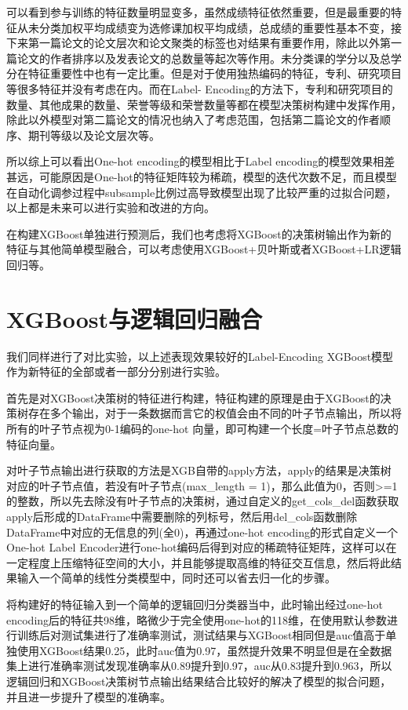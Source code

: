 可以看到参与训练的特征数量明显变多，虽然成绩特征依然重要，但是最重要的特征从未分类加权平均成绩变为选修课加权平均成绩，总成绩的重要性基本不变，接下来第一篇论文的论文层次和论文聚类的标签也对结果有重要作用，除此以外第一篇论文的作者排序以及发表论文的总数量等起次等作用。未分类课的学分以及总学分在特征重要性中也有一定比重。但是对于使用独热编码的特征，专利、研究项目等很多特征并没有考虑在内。而在Label- Encoding的方法下，专利和研究项目的数量、其他成果的数量、荣誉等级和荣誉数量等都在模型决策树构建中发挥作用，除此以外模型对第二篇论文的情况也纳入了考虑范围，包括第二篇论文的作者顺序、期刊等级以及论文层次等。

所以综上可以看出One-hot encoding的模型相比于Label encoding的模型效果相差甚远，可能原因是One-hot的特征矩阵较为稀疏，模型的迭代次数不足，而且模型在自动化调参过程中subsample比例过高导致模型出现了比较严重的过拟合问题，以上都是未来可以进行实验和改进的方向。

在构建XGBoost单独进行预测后，我们也考虑将XGBoost的决策树输出作为新的特征与其他简单模型融合，可以考虑使用XGBoost+贝叶斯或者XGBoost+LR逻辑回归等。

\section{XGBoost与逻辑回归融合}

我们同样进行了对比实验，以上述表现效果较好的Label-Encoding XGBoost模型作为新特征的全部或者一部分分别进行实验。

首先是对XGBoost决策树的特征进行构建，特征构建的原理是由于XGBoost的决策树存在多个输出，对于一条数据而言它的权值会由不同的叶子节点输出，所以将所有的叶子节点视为0-1编码的one-hot 向量，即可构建一个长度=叶子节点总数的特征向量。

对叶子节点输出进行获取的方法是XGB自带的apply方法，apply的结果是决策树对应的叶子节点值，若没有叶子节点(max\_length = 1)，那么此值为0，否则>=1的整数，所以先去除没有叶子节点的决策树，通过自定义的get\_cols\_del函数获取apply后形成的DataFrame中需要删除的列标号，然后用del\_cols函数删除DataFrame中对应的无信息的列(全0)，再通过one-hot encoding的形式自定义一个One-hot Label Encoder进行one-hot编码后得到对应的稀疏特征矩阵，这样可以在一定程度上压缩特征空间的大小，并且能够提取高维的特征交互信息，然后将此结果输入一个简单的线性分类模型中，同时还可以省去归一化的步骤。

将构建好的特征输入到一个简单的逻辑回归分类器当中，此时输出经过one-hot encoding后的特征共98维，略微少于完全使用one-hot的118维，在使用默认参数进行训练后对测试集进行了准确率测试，测试结果与XGBoost相同但是auc值高于单独使用XGBoost结果0.25，此时auc值为0.97，虽然提升效果不明显但是在全数据集上进行准确率测试发现准确率从0.89提升到0.97，auc从0.83提升到0.963，所以逻辑回归和XGBoost决策树节点输出结果结合比较好的解决了模型的拟合问题，并且进一步提升了模型的准确率。

